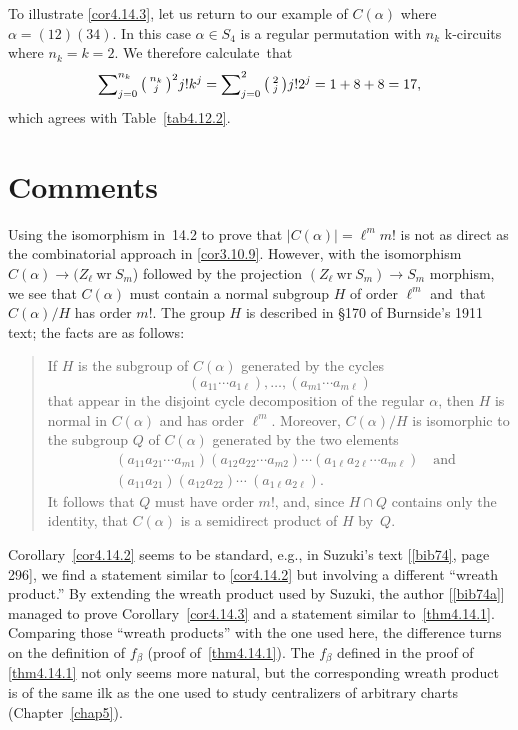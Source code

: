 \documentclass{surv-l}
\numberwithin{equation}{section}
\numberwithin{table}{section}
\numberwithin{figure}{section}
\theoremstyle{plain}
\theoremstyle{definition}
\begin{document}
To illustrate \ref{cor4.14.3}, let us return to our example of
$C(\alpha)$ where $\alpha=(12)(34)$. In this case $\alpha\in
S_{4}$ is a regular permutation with $n_{k}$ k-circuits where
$n_{k}= k=2$. We therefore calculate~that
\[
\sum\nolimits_{j=0}^{n_{k}} \big(\kern0.5pt\begin{smallmatrix}
n_{k}\\
j\end{smallmatrix}\kern0.5pt\big)^2 j!k^{j} = \sum\nolimits_{j=0}^{2} \big(\kern0.5pt\begin{smallmatrix}
2\\
j\end{smallmatrix}\kern0.5pt\big)j!2^{j}=1+8+8=17,
\]
which agrees with Table~\ref{tab4.12.2}.

\section{Comments}\label{sec4.15}

Using the isomorphism in~14.2 to prove that
$|C(\alpha)|=\ell^{m}m!$ is not as direct as the combinatorial
approach in \ref{cor3.10.9}. However, with the isomorphism
$C(\alpha)\rightarrow(Z_{\ell}\ \mathrm{wr}\ S_{m}$) followed by
the projection $(Z_{\ell}\ \mathrm{wr}\ S_{m})\rightarrow S_{m}$
morphism, we see that $C(\alpha)$ must contain a normal subgroup
$H$ of order $\ell^m$ and~that $C(\alpha)/H$ has order $m!$. The
group $H$ is described in \S170 of Burnside's 1911 text; the facts
are as follows:
\begin{quote}
If $H$ is the subgroup of $C(\alpha)$ generated by the cycles
\[
(a_{11}\cdots a_{1\ell}),\ldots, (a_{m1}\cdots a_{m\ell})
\]
that appear in the disjoint cycle decomposition of the regular
$\alpha$, then $H$ is normal in $C(\alpha)$ and has order
$\ell^{m}$. Moreover, $C(\alpha)/H$ is isomorphic to the subgroup
$Q$ of $C(\alpha)$ generated by the two elements
\begin{align*}
&(a_{11}a_{21}\cdots a_{m1})(a_{12}a_{22}\cdots
a_{m2})\cdots(a_{1\ell}a_{2\ell}\cdots a_{m\ell})\quad \mathrm{and} \\
&(a_{11}a_{21})(a_{12}a_{22})\cdots\ (a_{1\ell}a_{2\ell}).
\end{align*}
It follows that $Q$ must have order $m!$, and, since $H\cap Q$
contains only the identity, that $C(\alpha)$ is a semidirect
product of $H$ by~$Q$.
\end{quote}

Corollary~\ref{cor4.14.2} seems to be standard, e.g., in
Suzuki's text [\ref{bib74}, page
296], we find a statement similar to \ref{cor4.14.2} but
involving a different ``wreath product.'' By
extending the wreath product used by Suzuki, the
author [\ref{bib74a}] managed to prove
Corollary~\ref{cor4.14.3} and a statement similar
to~\ref{thm4.14.1}. Comparing those ``wreath products'' with the
one used here, the difference turns on the definition of
$f_{\beta}$ (proof of~\ref{thm4.14.1}). The $f_{\beta}$ defined in
the proof of \ref{thm4.14.1} not only seems more natural, but the
corresponding wreath product is of the same ilk as the one used to
study centralizers of arbitrary charts (Chapter~\ref{chap5}).
\end{document}
